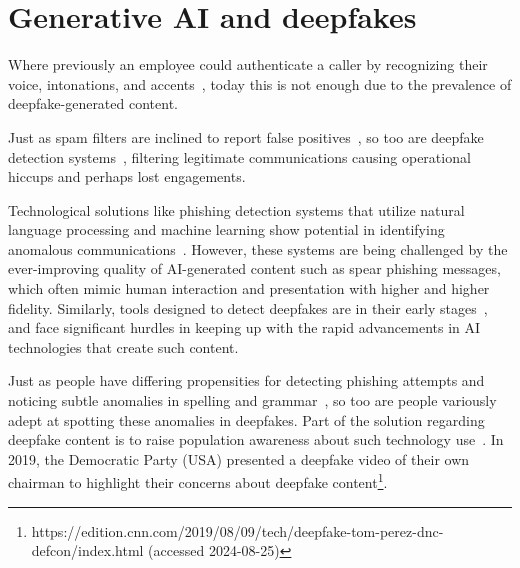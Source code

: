 \section{Generative AI and deepfakes}
\begin{comment}    
    - Deepfake content detection
    - Spear phishing detection
\end{comment}

Where previously an employee could authenticate a caller by recognizing their voice, intonations, and accents~\citep{mitnick_The_Art_of_Deception_2003}, today this is not enough due to the prevalence of deepfake-generated content.




Just as spam filters are inclined to report false positives~\citep{fakhouri_AI_Driven_Solutions_SE_Attacks_2024}, so too are deepfake detection systems~\citep{mirsky_Creation_Detection_Deepfakes_2021}, filtering legitimate communications causing operational hiccups and perhaps lost engagements.

Technological solutions like phishing detection systems that utilize natural language processing and machine learning show potential in identifying anomalous communications~\citep{basit_Comprehensive_Survey_AI_Phishing_Detection_2021}. However, these systems are being challenged by the ever-improving quality of AI-generated content such as spear phishing messages, which often mimic human interaction and presentation with higher and higher fidelity. Similarly, tools designed to detect deepfakes are in their early stages~\citep{mirsky_Creation_Detection_Deepfakes_2021}, and face significant hurdles in keeping up with the rapid advancements in AI technologies that create such content.

Just as people have differing propensities for detecting phishing attempts and noticing subtle anomalies in spelling and grammar~\citep{nicholson_Investigating_Teenagers_Detect_Phishing_2020, neupane_Social_Disorders_Facilitate_SE_2018}, so too are people variously adept at spotting these anomalies in deepfakes. Part of the solution regarding deepfake content is to raise population awareness about such technology use~\citep{blauth_AI_Crime_Overview_Malicious_Use_Abuse_2022}. In 2019, the Democratic Party (USA) presented a deepfake video of their own chairman to highlight their concerns about deepfake content\footnote{https://edition.cnn.com/2019/08/09/tech/deepfake-tom-perez-dnc-defcon/index.html (accessed 2024-08-25)}.





